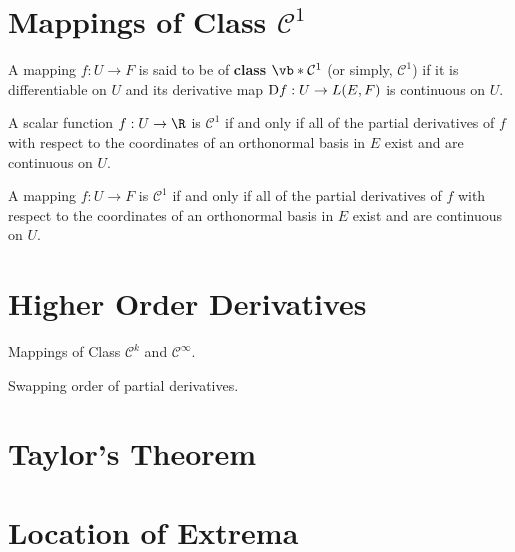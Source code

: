 \section{Mappings of Class \( \mathcal{C}^1\)}
\label{sec:C1}
\begin{definition}
  A mapping \( f:U\to F \) is said to be of \textbf{class \(\vb*{\mathcal{C}^1}\)} (or simply, \( \mathcal{C}^1 \)) if it is differentiable on \( U \) and its derivative map \( \text{D} f:U\to L(E,F) \) is continuous on \( U \).
\end{definition}

\begin{theorem}
  A scalar function \( f:U\to \R \) is \( \mathcal{C}^1 \) if and only if all of the partial derivatives of \( f \) with respect to the coordinates of an orthonormal basis in \( E \) exist and are continuous on \( U \).
\end{theorem}

\begin{theorem}
  A mapping \( f:U\to F \) is \( \mathcal{C}^1 \) if and only if all of the partial derivatives of \( f \) with respect to the coordinates of an orthonormal basis in \( E \) exist and are continuous on \( U \).
\end{theorem}
\section{Higher Order Derivatives}
Mappings of Class \( \mathcal{C}^k \) and \( \mathcal{C}^\infty \).

Swapping order of partial derivatives.
\section{Taylor's Theorem}
\section{Location of Extrema}


